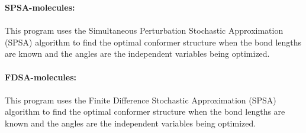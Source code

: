 \documentclass{article}
\begin{document}
\textbf{SPSA-molecules:}\\\\
This program uses the Simultaneous Perturbation Stochastic Approximation (SPSA) algorithm to find the optimal conformer structure when the bond lengths are known and the angles are the independent variables being optimized.\\\\
\textbf{FDSA-molecules:}\\\\
This program uses the Finite Difference Stochastic Approximation (SPSA) algorithm to find the optimal conformer structure when the bond lengths are known and the angles are the independent variables being optimized.
\end{document}

